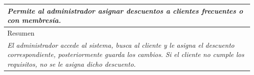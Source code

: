 \begin{table}[H]
\begin{tabular}{|llllllll|}
    \multicolumn{8}{|p{15cm}|}{{\color[HTML]{808080} \textit{Permite al administrador asignar descuentos a clientes frecuentes o con membresía.}}}                                                                                                                                                                                       \\ \hline
    \multicolumn{8}{|l|}{Resumen}                                                                                                                                                                                                                                           \\ \hline
    \multicolumn{8}{|p{15cm}|}{{\color[HTML]{808080} \textit{El administrador accede al sistema, busca al cliente y le asigna el descuento correspondiente, posteriormente guarda los cambios. Si el cliente no cumple los requisitos, no se le asigna dicho descuento.}}} \\ \hline
    \end{tabular}
\end{table}

